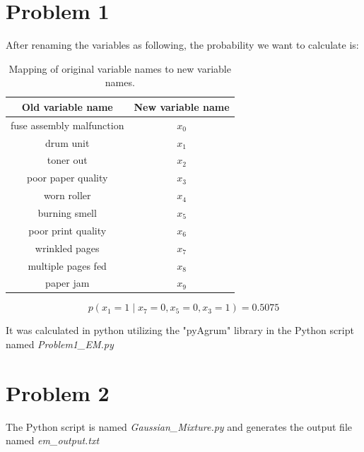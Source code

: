 \documentclass{article}
\begin{document}



\section*{Problem 1}

After renaming the variables as following, the probability we want to calculate is:



\begin{table}[H]
\centering
\begin{tabular}{|c|c|}
\hline
\textbf{Old variable name} & \textbf{New variable name} \\ \hline
fuse assembly malfunction & $x_0$ \\ \hline
drum unit                 & $x_1$ \\ \hline
toner out                 & $x_2$ \\ \hline
poor paper quality        & $x_3$ \\ \hline
worn roller               & $x_4$ \\ \hline
burning smell             & $x_5$ \\ \hline
poor print quality        & $x_6$ \\ \hline
wrinkled pages            & $x_7$ \\ \hline
multiple pages fed        & $x_8$ \\ \hline
paper jam                 & $x_9$ \\ \hline
\end{tabular}
\caption{Mapping of original variable names to new variable names.}
\label{tab:my-table}
\end{table}

\[
p(x_1 = 1 \mid x_7 = 0 , x_5 = 0 , x_3 = 1 ) = 0.5075
\]

It was calculated in python utilizing the "pyAgrum" library in the Python script named \textit{Problem1\_EM.py}


\section*{Problem 2}

The Python script is named \textit{Gaussian\_Mixture.py} and generates the output file named \textit{em\_output.txt} 


\end{document}
